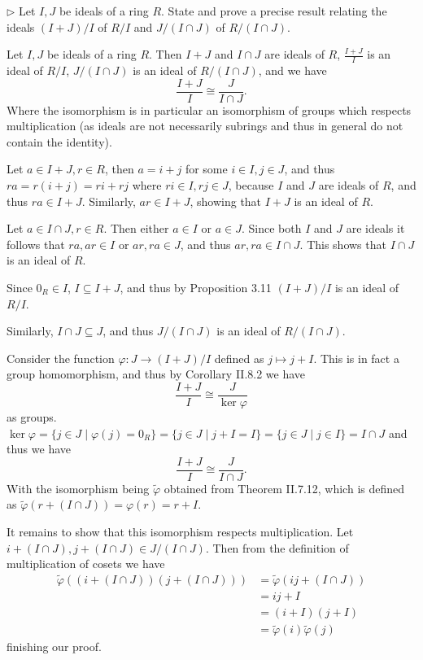 \begin{problem}
	$\triangleright$ Let $I, J$ be ideals of a ring $R$. State and prove a precise result relating the ideals $(I + J)/I$ of $R/I$ and $J/(I \cap J)$ of $R/(I \cap J)$.
\end{problem}

\begin{solution}
	Let $I, J$ be ideals of a ring $R$. Then $I + J$ and $I \cap J$ are ideals of $R$, $\frac{I + J}{I}$ is an ideal of $R/I$, $J/(I \cap J)$ is an ideal of $R/(I \cap J)$, and we have
	\[
		\frac{I + J}{I} \cong \frac{J}{I \cap J} \text{.}
	\]
	Where the isomorphism is in particular an isomorphism of groups which respects multiplication (as ideals are not necessarily subrings and thus in general do not contain the identity).
	
	Let $a \in I + J, r \in R$, then $a = i + j$ for some $i \in I, j \in J$, and thus $ra = r(i + j) = ri + rj$ where $ri \in I, rj \in J$, because $I$ and $J$ are ideals of $R$, and thus $ra \in I + J$. Similarly, $ar \in I + J$, showing that $I + J$ is an ideal of $R$.
	
	Let $a \in I \cap J, r \in R$. Then either $a \in I$ or $a \in J$. Since both $I$ and $J$ are ideals it follows that $ra, ar \in I$ or $ar, ra \in J$, and thus $ar, ra \in I \cap J$. This shows that $I \cap J$ is an ideal of $R$.
	
	Since $0_R \in I$, $I \subseteq I + J$, and thus by Proposition 3.11 $(I + J)/I$ is an ideal of $R/I$.
	
	Similarly, $I \cap J \subseteq J$, and thus $J/(I \cap J)$ is an ideal of $R/(I \cap J)$.
	
	Consider the function $\varphi: J \to (I + J)/I$ defined as $j \mapsto j + I$. This is in fact a group homomorphism, and thus by Corollary II.8.2 we have
	\[
		\frac{I + J}{I} \cong \frac{J}{\ker \varphi}
	\]
	as groups. $\ker \varphi = \{ j \in J \mid \varphi(j) = 0_R \} = \{ j \in J \mid j + I = I \} = \{ j \in J \mid j \in I \} = I \cap J$ and thus we have
	\[
		\frac{I+ J}{I} \cong \frac{J}{I \cap J} \text{.}
	\]
	With the isomorphism being $\widetilde{\varphi}$ obtained from Theorem II.7.12, which is defined as $\widetilde{\varphi}(r + (I \cap J)) = \varphi(r) = r + I$.
	
	It remains to show that this isomorphism respects multiplication. Let $i + (I \cap J), j + (I \cap J) \in J/(I \cap J)$. Then from the definition of multiplication of cosets we have
	\begin{align*}
		\widetilde{\varphi}((i + (I \cap J))(j + (I \cap J))) &= \widetilde{\varphi}(ij + (I \cap J)) \\
		&= ij + I \\
		&= (i + I)(j + I) \\
		&= \widetilde{\varphi}(i) \widetilde{\varphi}(j)
	\end{align*}
	finishing our proof.
\end{solution}

